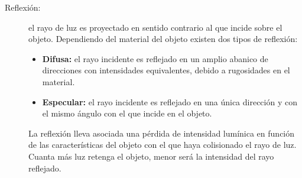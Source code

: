 \begin{description}
\item [Reflexión:] el rayo de luz es proyectado en sentido contrario al que incide sobre el objeto. Dependiendo del material del objeto existen dos tipos de reflexión:
\begin{itemize}
	\item \textbf{Difusa:} el rayo incidente es reflejado en un amplio abanico de direcciones con intensidades equivalentes, debido a rugosidades en el material. 
	\item \textbf{Especular:} el rayo incidente es reflejado en una única dirección y con el mismo ángulo con el que incide en el objeto.  
\end{itemize}

La reflexión lleva asociada una pérdida de intensidad lumínica en función de las características del objeto con el que haya colisionado el rayo de luz.  Cuanta más luz retenga el objeto, menor será la intensidad del rayo reflejado.


\end{description}
